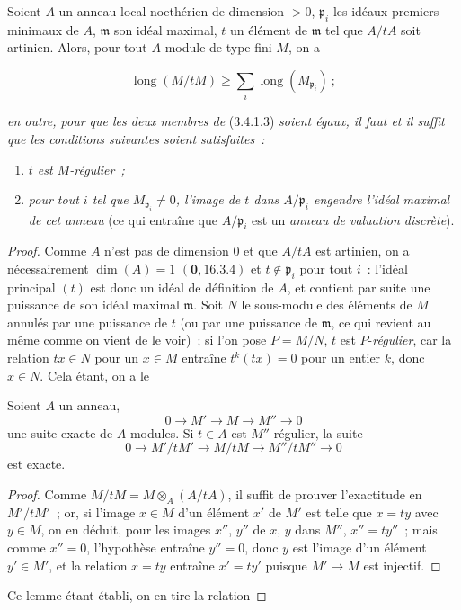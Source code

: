 \begin{lemma}[3.4.1.2]
\label{IV.2.3.4.1.2-fr}
Soient $A$ un anneau local noethérien de dimension $>0$, $\mathfrak p_i$ les
idéaux premiers minimaux de $A$, $\mathfrak m$ son idéal maximal, $t$ un
élément de $\mathfrak m$ tel que $A/tA$ soit artinien. Alors, pour tout
$A$-module de type fini $M$, on a
\end{lemma}

\begin{env}[3.4.1.3]
\label{IV.2.3.4.1.3-fr}
\[
\operatorname{long}(M/tM)
\geqslant\sum_i\operatorname{long}(M_{\mathfrak p_i})~;
\]
\end{env}

\textit{en outre, pour que les deux membres de} (3.4.1.3) \textit{soient égaux, il faut et il
suffit que les conditions suivantes soient satisfaites~:}


\begin{enumerate}
\item[$\alpha$)] \textit{$t$ est $M$-régulier~;}
\item[$\beta$)] \textit{pour tout $i$ tel que $M_{\mathfrak p_i}\neq0$, l'image de $t$
dans $A/\mathfrak p_i$ engendre l'idéal maximal de cet anneau} (ce qui entraîne
que $A/\mathfrak p_i$ est un \emph{anneau de valuation discrète}).
\end{enumerate}

\begin{proof}
Comme $A$ n'est pas de dimension $0$ et que $A/tA$ est artinien, on a
nécessairement $\dim(A)=1$ $(\mathbf{0},16.3.4)$ et $t\notin\mathfrak p_i$ pour tout
$i$~: l'idéal principal $(t)$ est donc un idéal de définition de $A$, et
contient par suite une puissance de son idéal maximal $\mathfrak m$. Soit $N$
le sous-module des éléments de $M$ annulés par une puissance de $t$ (ou par
une puissance de $\mathfrak m$, ce qui revient au même comme on vient de le
voir)~; si l'on pose $P=M/N$, $t$ est $P$-\emph{régulier}, car la relation $tx\in N$
pour un $x\in M$ entraîne $t^k(tx)=0$ pour un entier $k$, donc $x\in N$. Cela
étant, on a le

\begin{lemma}[3.4.1.4]
\label{IV.2.3.4.1.4-fr}
Soient $A$ un anneau,
\[
0\longrightarrow M'\longrightarrow M\longrightarrow M''\longrightarrow0
\]
une suite exacte de $A$-modules. Si $t\in A$ est $M''$-régulier, la suite
\[
0\longrightarrow M'/tM'\longrightarrow M/tM
\longrightarrow M''/tM''\longrightarrow0
\]
est exacte.
\end{lemma}

\begin{proof}
Comme $M/tM=M\otimes_A(A/tA)$, il suffit de prouver l'exactitude en $M'/tM'$~;
or, si l'image $x\in M$ d'un élément $x'$ de $M'$ est telle que $x=ty$ avec
$y\in M$, on en déduit, pour les images $x''$, $y''$ de $x$, $y$ dans $M''$,
$x''=ty''$~; mais comme $x''=0$, l'hypothèse entraîne $y''=0$, donc $y$ est
l'image d'un élément $y'\in M'$, et la relation $x=ty$ entraîne $x'=ty'$
puisque $M'\to M$ est injectif.
\end{proof}

Ce lemme étant établi, on en tire la relation
\end{proof}

